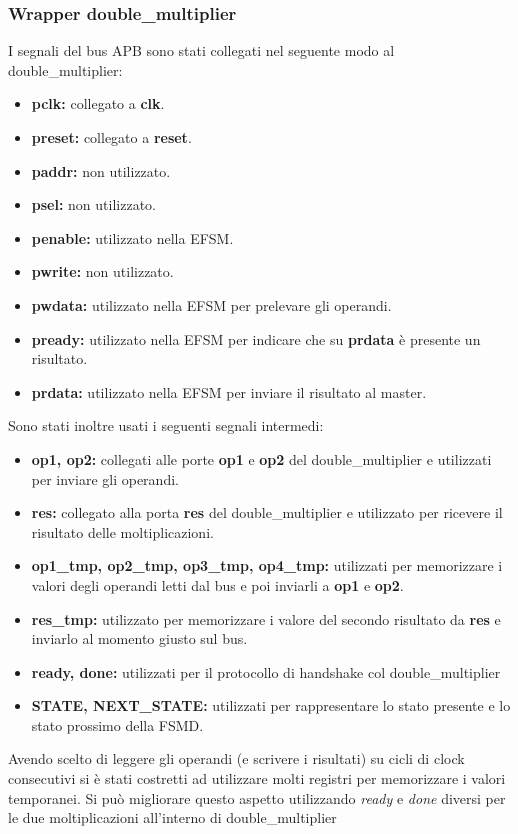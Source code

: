 \documentclass[]{IEEEtran}
\begin{document}
\subsubsection{Wrapper double\_multiplier}
I segnali del bus APB sono stati collegati nel seguente modo al double\_multiplier:
\begin{itemize}
    \item \textbf{pclk:} collegato a \textbf{clk}.
    \item \textbf{preset:} collegato a \textbf{reset}.
    \item \textbf{paddr:} non utilizzato.
    \item \textbf{psel:} non utilizzato.
    \item \textbf{penable:} utilizzato nella EFSM.
    \item \textbf{pwrite:} non utilizzato.
    \item \textbf{pwdata:} utilizzato nella EFSM per prelevare gli operandi.
    \item \textbf{pready:} utilizzato nella EFSM per indicare che su \textbf{prdata} è presente un risultato.
    \item \textbf{prdata:} utilizzato nella EFSM per inviare il risultato al master.
\end{itemize}
Sono stati inoltre usati i seguenti segnali intermedi:
\begin{itemize}
    \item \textbf{op1, op2:} collegati alle porte \textbf{op1} e \textbf{op2} del double\_multiplier e utilizzati per inviare gli operandi.
    \item \textbf{res:} collegato alla porta \textbf{res} del double\_multiplier e utilizzato per ricevere il risultato delle moltiplicazioni.
    \item \textbf{op1\_tmp, op2\_tmp, op3\_tmp, op4\_tmp:} utilizzati per memorizzare i valori degli operandi letti dal bus e poi inviarli a \textbf{op1} e \textbf{op2}.
    \item \textbf{res\_tmp:} utilizzato per memorizzare i valore del secondo risultato da \textbf{res} e inviarlo al momento giusto sul bus.
    \item \textbf{ready, done:} utilizzati per il protocollo di handshake col double\_multiplier
    \item \textbf{STATE, NEXT\_STATE:} utilizzati per rappresentare lo stato presente e lo stato prossimo della FSMD.
\end{itemize}
Avendo scelto di leggere gli operandi (e scrivere i risultati) su cicli di clock consecutivi si è stati costretti ad utilizzare molti registri per memorizzare i valori temporanei. Si può migliorare questo aspetto utilizzando \textit{ready} e \textit{done} diversi per le due moltiplicazioni all'interno di double\_multiplier
\end{document}
